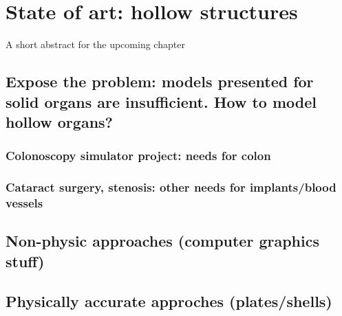 \chapter{State of art: hollow structures}
\label{chap7}
\begin{shortAbstract}
A short abstract for the upcoming chapter
\end{shortAbstract}


\section{Expose the problem: models presented for solid organs are insufficient. How to model hollow organs?}
	\subsection{Colonoscopy simulator project: needs for colon}
	\subsection{Cataract surgery, stenosis: other needs for implants/blood vessels}
		
\section{Non-physic approaches (computer graphics stuff)}
		
\section{Physically accurate approches (plates/shells)}